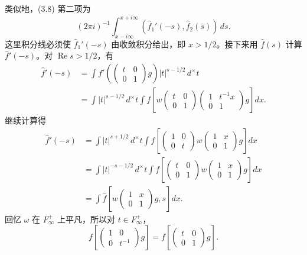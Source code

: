 类似地，(3.8) 第二项为
\[
 (2\pi i)^{-1}\int_{x-i\infty}^{x+i\infty}
 (\widehat f_1'(-s),\widehat f_2(\bar s))\,ds.
\]
这里积分线必须使 $\widehat f_1'(-s)$ 由收敛积分给出，即 $x>1/2$。接下来用
$\widehat f(s)$ 计算 $\widehat f'(-s)$。对 $\operatorname{Re}s>1/2$，有
\[
\begin{aligned}
 \widehat f'(-s)
 &=\int f'\!\left(\begin{pmatrix}t&0\\0&1\end{pmatrix}g\right)|t|^{s-1/2}\,d^\times t\\
 &=\int|t|^{s-1/2}\,d^\times t\int
 f\!\left[w\begin{pmatrix}t&0\\0&1\end{pmatrix}
 \begin{pmatrix}1&t^{-1}x\\0&1\end{pmatrix}g\right]dx.
\end{aligned}
\]
继续计算得
\[
\begin{aligned}
 \widehat f'(-s)
 &=\int|t|^{s+1/2}\,d^\times t\int
 f\!\left[\begin{pmatrix}1&0\\0&t\end{pmatrix}w
 \begin{pmatrix}1&x\\0&1\end{pmatrix}g\right]dx\\
 &=\int|t|^{-s-1/2}\,d^\times t\int
 f\!\left[\begin{pmatrix}t&0\\0&1\end{pmatrix}w
 \begin{pmatrix}1&x\\0&1\end{pmatrix}g\right]dx\\
 &=\int\widehat f\!\left[w\begin{pmatrix}1&x\\0&1\end{pmatrix}g,s\right]dx.
\end{aligned}
\]
回忆 $\omega$ 在 $F_\infty^+$ 上平凡，所以对 $t\in F_\infty^+$，
\[
 f\!\left[\begin{pmatrix}1&0\\0&t^{-1}\end{pmatrix}g\right]
 =f\!\left[\begin{pmatrix}t&0\\0&1\end{pmatrix}g\right].
\]
